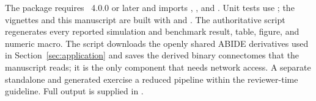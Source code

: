 \documentclass[article]{jss}\usepackage[]{graphicx}\usepackage[]{xcolor}
\begin{document}
The package requires ~4.0.0 or later and imports ,
, and  \citep{igraph}. Unit tests use 
\citep{testthat}; the vignettes and this manuscript are built with 
\citep{knitr} and  \citep{rmarkdown}. The authoritative
 script regenerates every reported simulation and benchmark
result, table, figure, and numeric macro. The  script
downloads the openly shared ABIDE derivatives used in
Section~\ref{sec:application} and saves the derived binary connectomes that the
manuscript reads; it is the only component that needs network access.
A separate standalone  and generated  exercise a
reduced pipeline within the reviewer-time guideline. Full
 output is supplied in
.


\end{document}
